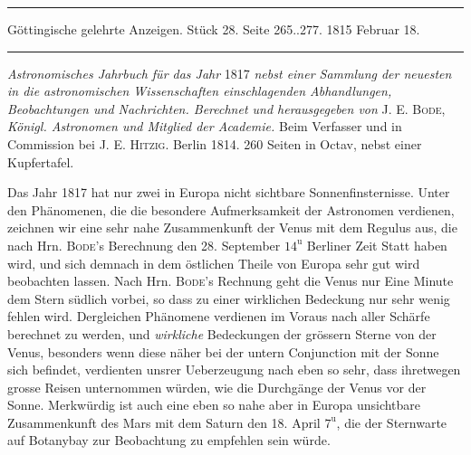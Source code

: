 \par\bigskip
\hypertarget{native-581-lower}{}
\begin{center}
\parbox{.92\linewidth}{\centering\small
\rule{\linewidth}{.3pt}\par\smallskip
Göttingische gelehrte Anzeigen. Stück 28. Seite 265..277. 1815 Februar 18.\par\smallskip
\rule{\linewidth}{.3pt}}
\end{center}
\par\medskip

\emph{Astronomisches Jahrbuch für das Jahr} 1817 \emph{nebst einer Sammlung der neuesten in die
astronomischen Wissenschaften einschlagenden Abhandlungen, Beobachtungen und Nachrichten.
Berechnet und herausgegeben von} J. E. \textsc{Bode}, \emph{Königl. Astronomen und Mitglied der
Academie.} Beim Verfasser und in Commission bei J. E. \textsc{Hitzig}. 
Berlin 1814. 260 Seiten in Octav, nebst einer Kupfertafel.

Das Jahr 1817 hat nur zwei in Europa nicht sichtbare Sonnenfinsternisse. Unter den Phänomenen,
die die besondere Aufmerksamkeit der Astronomen verdienen, zeichnen wir eine sehr nahe
Zusammenkunft der Venus mit dem Regulus aus, die nach Hrn. \textsc{Bode}'s Berechnung den
28. September $14^{\mathrm{u}}$ Berliner Zeit Statt haben wird, und sich demnach in dem
östlichen Theile von Europa sehr gut wird beobachten lassen. Nach Hrn. \textsc{Bode}'s Rechnung
geht die Venus nur Eine Minute dem Stern südlich vorbei, so dass zu einer wirklichen Bedeckung
nur sehr wenig fehlen wird. Dergleichen Phänomene verdienen im Voraus nach aller Schärfe berechnet
zu werden, und \emph{wirkliche} Bedeckungen der grössern Sterne von der Venus, besonders wenn
diese näher bei der untern Conjunction mit der Sonne sich befindet, verdienten unsrer Ueberzeugung
nach eben so sehr, dass ihretwegen grosse Reisen unternommen würden, wie die Durchgänge der Venus
vor der Sonne. Merkwürdig ist auch eine eben so nahe aber in Europa unsichtbare Zusammenkunft des
Mars mit dem Saturn den 18. April $7^{\mathrm{u}}$, die der Sternwarte auf Botanybay zur
Beobachtung zu empfehlen sein würde.

